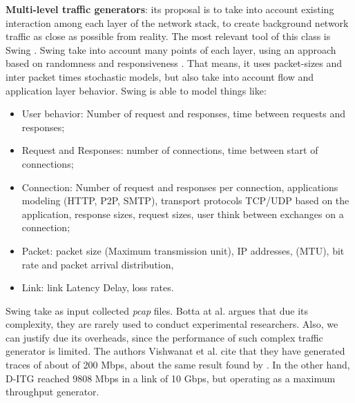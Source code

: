 \textbf{Multi-level traffic generators}: its proposal is to take into account existing interaction among each layer of the network stack, to create background network traffic as close as possible from reality. The most relevant tool of this class is Swing \cite{swing-paper}. Swing take into account many points of each layer, using an approach based on randomness and responsiveness \cite{swing-paper}. That means, it uses packet-sizes and inter packet times stochastic models, but also take into account flow and application layer behavior. Swing is able to model things like\cite{swing-paper}: 

\begin{itemize}
	
	\item User behavior: Number of request and responses, time between requests and responses;
	
	\item Request and Responses: number of connections, time between start of connections;
	
	\item Connection: Number of request and responses per connection, applications modeling (HTTP, P2P, SMTP), transport protocols TCP/UDP based on the application, response sizes, request sizes, user think between exchanges on a connection;
	
	\item Packet: packet size (Maximum transmission unit), IP addresses, (MTU), bit rate and packet arrival distribution, 
	
	\item Link: link Latency Delay, loss rates.
	
	
\end{itemize}

Swing take as input collected \textit{pcap} files. Botta at al. \cite{do-you-trust} argues that due its complexity, they are rarely used to conduct experimental researchers. Also, we can  justify due its overheads, since the performance of such complex traffic generator is limited\cite{legotg-paper}. The authors Vishwanat et al. \cite{swing-paper} cite that they have generated traces of about of 200 Mbps, about the same result found by \cite{legotg-paper}. In the other hand, D-ITG reached 9808 Mbps\cite{comparative-trafficgen-tools} in a link of 10 Gbps, but operating as a maximum throughput generator.



